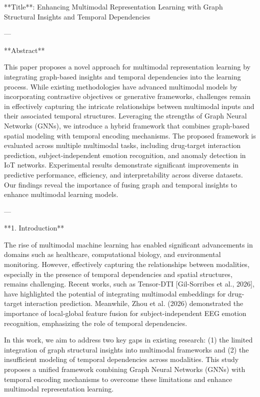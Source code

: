 **Title**: Enhancing Multimodal Representation Learning with Graph Structural Insights and Temporal Dependencies

---

**Abstract**

This paper proposes a novel approach for multimodal representation learning by integrating graph-based insights and temporal dependencies into the learning process. While existing methodologies have advanced multimodal models by incorporating contrastive objectives or generative frameworks, challenges remain in effectively capturing the intricate relationships between multimodal inputs and their associated temporal structures. Leveraging the strengths of Graph Neural Networks (GNNs), we introduce a hybrid framework that combines graph-based spatial modeling with temporal encoding mechanisms. The proposed framework is evaluated across multiple multimodal tasks, including drug-target interaction prediction, subject-independent emotion recognition, and anomaly detection in IoT networks. Experimental results demonstrate significant improvements in predictive performance, efficiency, and interpretability across diverse datasets. Our findings reveal the importance of fusing graph and temporal insights to enhance multimodal learning models.

---

**1. Introduction**

The rise of multimodal machine learning has enabled significant advancements in domains such as healthcare, computational biology, and environmental monitoring. However, effectively capturing the relationships between modalities, especially in the presence of temporal dependencies and spatial structures, remains challenging. Recent works, such as Tensor-DTI [Gil-Sorribes et al., 2026], have highlighted the potential of integrating multimodal embeddings for drug-target interaction prediction. Meanwhile, Zhou et al. (2026) demonstrated the importance of local-global feature fusion for subject-independent EEG emotion recognition, emphasizing the role of temporal dependencies.

In this work, we aim to address two key gaps in existing research: (1) the limited integration of graph structural insights into multimodal frameworks and (2) the insufficient modeling of temporal dependencies across modalities. This study proposes a unified framework combining Graph Neural Networks (GNNs) with temporal encoding mechanisms to overcome these limitations and enhance multimodal representation learning.

